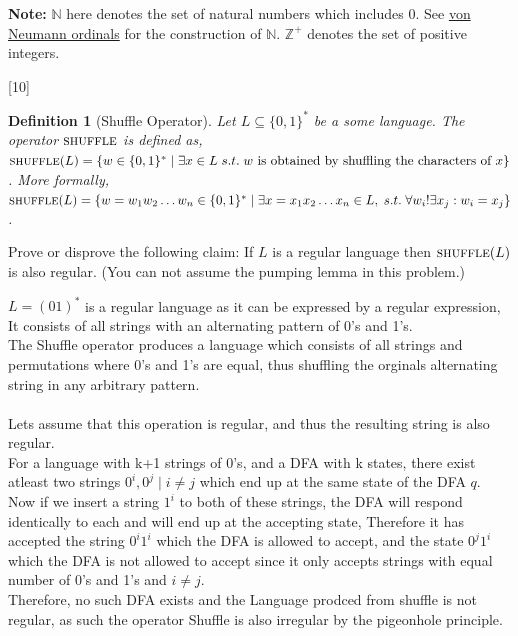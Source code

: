 \documentclass[a4paper]{exam}
\newcommand{\shuffle}{\textsc{shuffle}} %
\newtheorem{definition}{Definition}
\begin{document}
\begin{questions}
    \textbf{Note:} $\mathbb{N}$ here denotes the set of natural numbers which includes 0. See \href{https://en.wikipedia.org/wiki/Set-theoretic_definition_of_natural_numbers}{von Neumann ordinals} for the construction of $\mathbb{N}$.
    $\mathbb{Z}^+$ denotes the set of positive integers.

    [10]

    \begin{definition}[Shuffle Operator]
        Let $L \subseteq \{0,1\}^*$ be a some language. The operator $\shuffle$ is defined as, $\shuffle(L) = \{w\in \{0,1\}^*\mid \exists x \in L \;s.t. \; w \text{ is obtained by shuffling the characters of } x\}$. More formally, $\shuffle(L) = \{w = w_1w_2\dots w_n\in \{0,1\}^*\mid \exists x = x_1x_2 \dots x_n \in L, \;s.t.\; \forall w_i !\exists x_j : w_i = x_j\}$. 
    \end{definition}
    
    Prove or disprove the following claim: 
    If $L$ is a regular language then $\shuffle(L)$ is also regular.
    (You can not assume the pumping lemma in this problem.)

    \begin{solution}
        $L = (01)^*$ is a regular language as it can be expressed by a regular expression, It consists of all strings 
        with an alternating pattern of 0's and 1's. \\ 
        The Shuffle operator produces a language which consists of all strings and permutations where 0's and 1's are equal, thus shuffling the orginals alternating string in any arbitrary pattern. \\ 
        \\ 
        Lets assume that this operation is regular, and thus the resulting string is also regular. \\

        For a language with k+1 strings of 0's, and a DFA with k states, there exist atleast two strings $0^i, 0^j \mid i \neq j$ which end up at the same state of the DFA $q$. \\ 
        Now if we insert a string $1^i$ to both of these strings, the DFA will respond identically to each and will end up at the accepting state, Therefore it has accepted the string $0^i 1^i$ which the DFA is allowed to accept, and the state $0^j 1^i$ which the DFA is not allowed to accept since it only accepts strings with equal number of 0's and 1's and $i \neq j$. \\ 
        Therefore, no such DFA exists and the Language prodced from shuffle is not regular, as such the operator Shuffle is also irregular by the pigeonhole principle. 
    \end{solution}


\end{questions}
\end{document}
